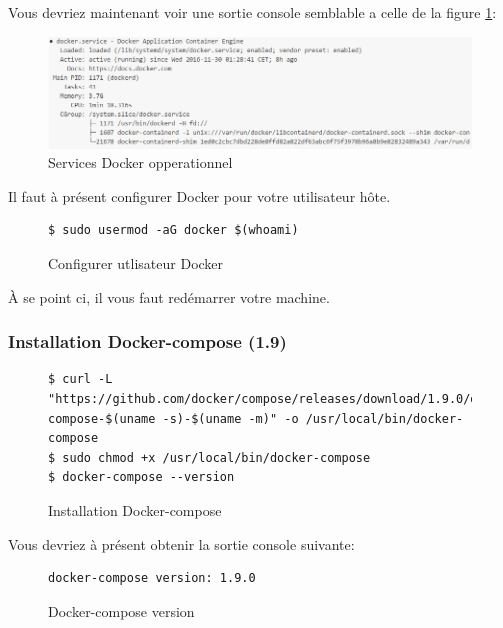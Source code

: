Vous devriez maintenant voir une sortie console semblable a celle de la figure \ref{fig:dockerservices}:

\begin{figure}[H] 
\centering 
\includegraphics[width=1\columnwidth]{img/docker-services} 
\caption[docker services]{Services Docker opperationnel}
\label{fig:dockerservices} 
\end{figure}

Il faut à présent configurer Docker pour votre utilisateur hôte.

\begin{figure}[H] 
\centering
\begin{lstlisting}[frame=single]
$ sudo usermod -aG docker $(whoami)
\end{lstlisting}
\caption[Code - Configurer utlisateur Docker]{Configurer utlisateur Docker}
\label{fig:configUserDocker} 
\end{figure}

À se point ci, il vous faut redémarrer votre machine.

\subsubsection{Installation Docker-compose (1.9)}

\begin{figure}[H] 
\centering 
\begin{lstlisting}[frame=single]
$ curl -L "https://github.com/docker/compose/releases/download/1.9.0/docker-compose-$(uname -s)-$(uname -m)" -o /usr/local/bin/docker-compose
$ sudo chmod +x /usr/local/bin/docker-compose
$ docker-compose --version
\end{lstlisting}
\caption[Code - Installation Docker-compose]{Installation Docker-compose}
\label{fig:installCompose} 
\end{figure}

Vous devriez à présent obtenir la sortie console suivante:

\begin{figure}[H] 
\centering 
\begin{lstlisting}[frame=single]
docker-compose version: 1.9.0
\end{lstlisting}
\caption[Code - Docker-compose version]{Docker-compose version}
\label{fig:composeVersion} 
\end{figure}

